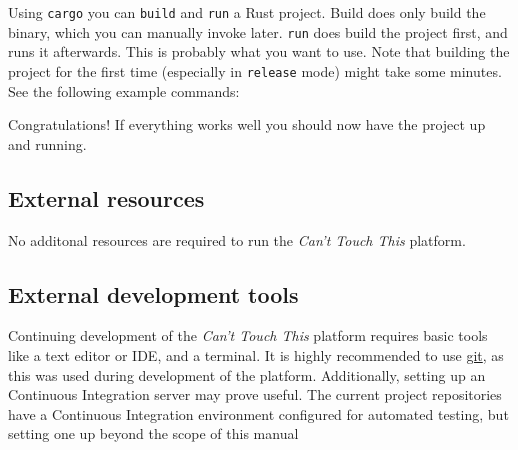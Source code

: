 \documentclass{standalone}
\begin{document}
  Using \verb_cargo_ you can \verb_build_ and \verb_run_ a Rust project. Build
  does only build the binary, which you can manually invoke later. \verb_run_
  does build the project first, and runs it afterwards. This is probably what
  you want to use. Note that building the project for the first time
  (especially in \verb_release_ mode) might take some minutes.
  See the following example commands:

  

  Congratulations! If everything works well you should now have the project up
  and running.

  \subsection{External resources}
  No additonal resources are required to run the \textit{Can't Touch This}
  platform.

  \subsection{External development tools}
  Continuing development of the \textit{Can't Touch This} platform requires
  basic tools like a text editor or IDE, and a terminal. It is highly
  recommended to use \href{https://git-scm.com/}{git}, as this was used during
  development of the platform. Additionally, setting up an Continuous Integration server may prove
  useful. The current project repositories have a Continuous Integration
  environment configured for automated testing, but setting one up beyond the
  scope of this manual 

  \clearpage
\end{document}
